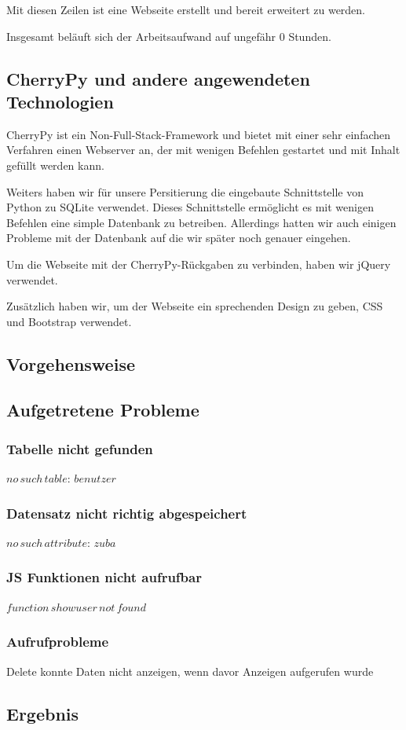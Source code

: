 Mit diesen Zeilen ist eine Webseite erstellt und bereit erweitert zu werden.

Insgesamt beläuft sich der Arbeitsaufwand auf ungefähr 0 Stunden.

\subsection{CherryPy und andere angewendeten Technologien}

CherryPy ist ein Non-Full-Stack-Framework und bietet mit einer sehr einfachen Verfahren einen Webserver an, der mit wenigen Befehlen gestartet und mit Inhalt gefüllt werden kann.

Weiters haben wir für unsere Persitierung die eingebaute Schnittstelle von Python zu SQLite verwendet. Dieses Schnittstelle ermöglicht es mit wenigen Befehlen eine simple Datenbank zu betreiben. Allerdings hatten wir auch einigen Probleme mit der Datenbank auf die wir später noch genauer eingehen.

Um die Webseite mit der CherryPy-Rückgaben zu verbinden, haben wir jQuery verwendet. 

Zusätzlich haben wir, um der Webseite ein sprechenden Design zu geben, CSS und Bootstrap verwendet. 


\subsection{Vorgehensweise}


\subsection{Aufgetretene Probleme}

\subsubsection{Tabelle nicht gefunden}$ no\,such\,table:\,benutzer $ 

\subsubsection{Datensatz nicht richtig abgespeichert}$ no\,such\,attribute:\,zuba $ 

\subsubsection{JS Funktionen nicht aufrufbar}$ function\,showuser\,not\,found $ 

\subsubsection{Aufrufprobleme}Delete konnte Daten nicht anzeigen, wenn davor Anzeigen aufgerufen wurde


\subsection{Ergebnis}
